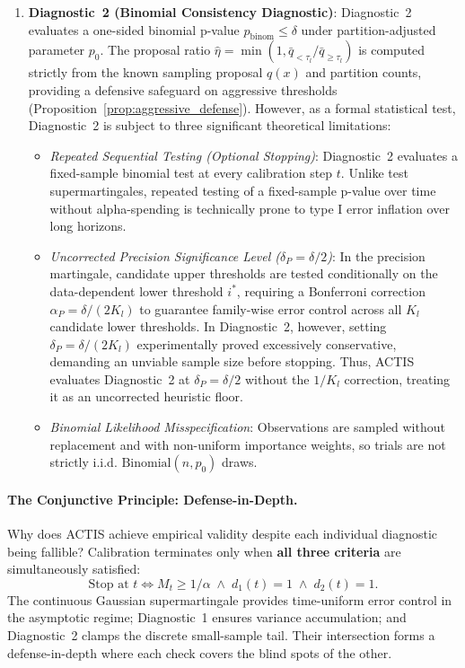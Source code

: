 \documentclass[11pt,a4paper]{article}
\begin{document}
\begin{enumerate}[leftmargin=*]
    \item \textbf{Diagnostic~2 (Binomial Consistency Diagnostic)}:
    Diagnostic~2 evaluates a one-sided binomial p-value $p_{\text{binom}} \le \delta$ under partition-adjusted parameter $p_0$. The proposal ratio $\hat{\eta} = \min(1, \bar{q}_{< \tau_l}/\bar{q}_{\ge \tau_l})$ is computed strictly from the known sampling proposal $q(x)$ and partition counts, providing a defensive safeguard on aggressive thresholds (Proposition~\ref{prop:aggressive_defense}). However, as a formal statistical test, Diagnostic~2 is subject to three significant theoretical limitations:
    \begin{itemize}
        \item \emph{Repeated Sequential Testing (Optional Stopping)}: Diagnostic~2 evaluates a fixed-sample binomial test at every calibration step $t$. Unlike test supermartingales, repeated testing of a fixed-sample p-value over time without alpha-spending is technically prone to type I error inflation over long horizons.
        \item \emph{Uncorrected Precision Significance Level ($\delta_P = \delta/2$)}: In the precision martingale, candidate upper thresholds are tested conditionally on the data-dependent lower threshold $i^*$, requiring a Bonferroni correction $\alpha_P = \delta / (2 K_l)$ to guarantee family-wise error control across all $K_l$ candidate lower thresholds. In Diagnostic~2, however, setting $\delta_P = \delta / (2 K_l)$ experimentally proved excessively conservative, demanding an unviable sample size before stopping. Thus, ACTIS evaluates Diagnostic~2 at $\delta_P = \delta / 2$ without the $1/K_l$ correction, treating it as an uncorrected heuristic floor.
        \item \emph{Binomial Likelihood Misspecification}: Observations are sampled without replacement and with non-uniform importance weights, so trials are not strictly i.i.d. $\text{Binomial}(n, p_0)$ draws.
    \end{itemize}
\end{enumerate}

\paragraph{The Conjunctive Principle: Defense-in-Depth.}
Why does ACTIS achieve empirical validity despite each individual diagnostic being fallible?
Calibration terminates only when \textbf{all three criteria} are simultaneously satisfied:
\begin{equation}
\text{Stop at } t \iff M_t \ge 1/\alpha \;\land\; d_1(t) = 1 \;\land\; d_2(t) = 1.
\end{equation}
The continuous Gaussian supermartingale provides time-uniform error control in the asymptotic regime; Diagnostic~1 ensures variance accumulation; and Diagnostic~2 clamps the discrete small-sample tail. Their intersection forms a defense-in-depth where each check covers the blind spots of the other.
\end{document}
